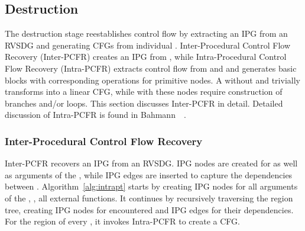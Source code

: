 \subsection{Destruction}\label{sec:destruction}
The destruction stage reestablishes control flow by extracting an IPG from an RVSDG
and generating CFGs from individual \lambdaregions. Inter-Procedural Control Flow Recovery
(Inter-PCFR) creates an IPG from \lambdanodes, while
Intra-Procedural Control Flow Recovery (Intra-PCFR) extracts control flow from \gammam and
\thetanodes and generates basic blocks with corresponding operations for primitive nodes.
A \lambdaregion without \gammam and \thetanodes trivially transforms into a linear CFG,
while \lambdaregions with these nodes require construction of branches and/or loops.
This section discusses Inter-PCFR in detail. Detailed discussion
of Intra-PCFR is found in Bahmann~\etal~\cite{Bahmann15}.

\subsubsection{Inter-Procedural Control Flow Recovery}\label{sec:ipcfr}
Inter-PCFR recovers an IPG from an RVSDG. IPG nodes are created for \lambdanodes as well as
arguments of the \omegaregion, while IPG edges are inserted to capture the dependencies between
\lambdanodes. Algorithm~\ref{alg:intrapt} starts by
creating IPG nodes for all arguments of the \omegaregion, \ie, all external functions. It
continues by recursively traversing the region tree, creating IPG nodes for encountered
\lambdanodes and IPG edges for their dependencies. For the region of every \lambdanode, it
invokes Intra-PCFR to create a CFG.

